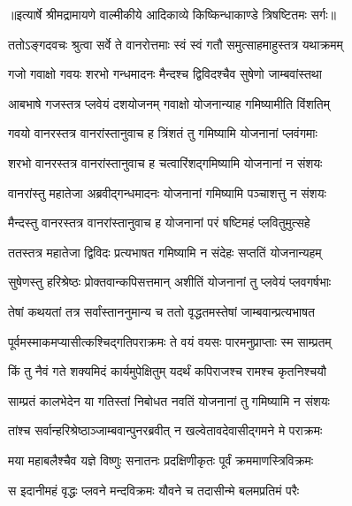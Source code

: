 \addtocounter{shlokacount}{1}


{॥इत्यार्षे श्रीमद्रामायणे वाल्मीकीये आदिकाव्ये किष्किन्धाकाण्डे त्रिषष्टितमः सर्गः॥}


\twolineshloka
{ततोऽङ्गदवचः श्रुत्वा सर्वे ते वानरोत्तमाः}
{स्वं स्वं गतौ समुत्साहमाहुस्तत्र यथाक्रमम्} %

\twolineshloka
{गजो गवाक्षो गवयः शरभो गन्धमादनः}
{मैन्दश्च द्विविदश्चैव सुषेणो जाम्बवांस्तथा} %

\twolineshloka
{आबभाषे गजस्तत्र प्लवेयं दशयोजनम्}
{गवाक्षो योजनान्याह गमिष्यामीति विंशतिम्} %

\twolineshloka
{गवयो वानरस्तत्र वानरांस्तानुवाच ह}
{त्रिंशतं तु गमिष्यामि योजनानां प्लवंगमाः} %

\twolineshloka
{शरभो वानरस्तत्र वानरांस्तानुवाच ह}
{चत्वारिंशद्गमिष्यामि योजनानां न संशयः} %

\twolineshloka
{वानरांस्तु महातेजा अब्रवीद्गन्धमादनः}
{योजनानां गमिष्यामि पञ्चाशत्तु न संशयः} %

\twolineshloka
{मैन्दस्तु वानरस्तत्र वानरांस्तानुवाच ह}
{योजनानां परं षष्टिमहं प्लवितुमुत्सहे} %

\twolineshloka
{ततस्तत्र महातेजा द्विविदः प्रत्यभाषत}
{गमिष्यामि न संदेहः सप्ततिं योजनान्यहम्} %

\twolineshloka
{सुषेणस्तु हरिश्रेष्ठः प्रोक्तवान्कपिसत्तमान्}
{अशीतिं योजनानां तु प्लवेयं प्लवगर्षभाः} %

\twolineshloka
{तेषां कथयतां तत्र सर्वांस्ताननुमान्य च}
{ततो वृद्धतमस्तेषां जाम्बवान्प्रत्यभाषत} %

\twolineshloka
{पूर्वमस्माकमप्यासीत्कश्चिद्गतिपराक्रमः}
{ते वयं वयसः पारमनुप्राप्ताः स्म साम्प्रतम्} %

\twolineshloka
{किं तु नैवं गते शक्यमिदं कार्यमुपेक्षितुम्}
{यदर्थं कपिराजश्च रामश्च कृतनिश्चयौ} %

\twolineshloka
{साम्प्रतं कालभेदेन या गतिस्तां निबोधत}
{नवतिं योजनानां तु गमिष्यामि न संशयः} %

\twolineshloka
{तांश्च सर्वान्हरिश्रेष्ठाञ्जाम्बवान्पुनरब्रवीत्}
{न खल्वेतावदेवासीद्गमने मे पराक्रमः} %

\twolineshloka
{मया महाबलैश्चैव यज्ञे विष्णुः सनातनः}
{प्रदक्षिणीकृतः पूर्वं क्रममाणस्त्रिविक्रमः} %

\twolineshloka
{स इदानीमहं वृद्धः प्लवने मन्दविक्रमः}
{यौवने च तदासीन्मे बलमप्रतिमं परैः} %

